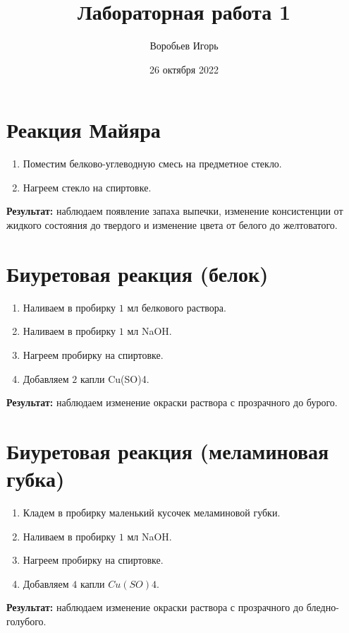 \documentclass[12pt, letterpaper, twoside]{article}
\title{Лабораторная работа 1}
\author{Воробьев Игорь}
\date{26 октября 2022}
\begin{document}
\maketitle

\section{Реакция Майяра}
\begin{enumerate}
	\item Поместим белково-углеводную смесь на предметное стекло.
	\item Нагреем стекло на спиртовке.
\end{enumerate}
\textbf{Результат:} наблюдаем появление запаха выпечки, изменение консистенции от жидкого состояния до твердого и изменение цвета от белого до желтоватого.

\section{Биуретовая реакция (белок)}
\begin{enumerate}
	\item Наливаем в пробирку $1$ мл белкового раствора. 
	\item Наливаем в пробирку $1$ мл NaOH.
	\item Нагреем пробирку на спиртовке.
	\item Добавляем $2$ капли Cu(SO)4.
\end{enumerate}
\textbf{Результат:} наблюдаем изменение окраски раствора с прозрачного до бурого.

\section{Биуретовая реакция (меламиновая губка)}
\begin{enumerate}
	\item Кладем в пробирку маленький кусочек меламиновой губки. 
	\item Наливаем в пробирку $1$ мл NaOH.
	\item Нагреем пробирку на спиртовке.
	\item Добавляем $4$ капли $Cu(SO)4$.
\end{enumerate}
\textbf{Результат:} наблюдаем изменение окраски раствора с прозрачного до бледно-голубого. 
\end{document}
